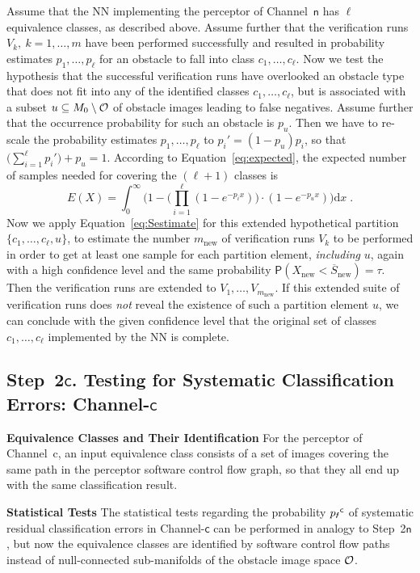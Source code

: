 \documentclass[runningheads,a4paper]{llncs}
\begin{document}
Assume that the NN implementing the perceptor of Channel~$\mathsf{n}$ has $\ell$ equivalence classes, as described  above. Assume further that the verification runs $V_k,\ k=1,\dots,m$ have been performed successfully and resulted in probability estimates $p_1,\dots,p_\ell$ for an obstacle to fall into class $c_1,\dots,c_\ell$.
Now we test the hypothesis that the successful verification runs have overlooked an obstacle type that does not fit into any of the identified classes $c_1,\dots,c_\ell$, but is associated with a subset $u\subseteq M_0\setminus {\cal O}$ of obstacle images leading to false negatives.  Assume further that the occurrence probability 
for such an obstacle is $p_u$. Then we have to re-scale the probability estimates $p_1,\dots,p_\ell$   
to $p_i' = (1-p_u)p_i$, so that
$
\big(\sum_{i=1}^\ell p_i'\big) + p_u = 1.
$
According to Equation~\eqref{eq:expected},
the expected number of   samples needed for covering the $(\ell+1)$ classes is
$$
E(X) = \int_0^\infty \Big( 1 - \big(\prod_{i=1}^\ell (1 - e^{-p_i x})\big)\cdot (1 - e^{-p_u x})  \Big)\mathrm{d}x\;.
$$
Now we apply Equation~\eqref{eq:Sestimate} for this extended hypothetical     partition
$\{c_1,\dots,c_\ell, u\}$,   to estimate the number $m_\text{new}$ of verification runs $V_k$ to be performed in order to get at least one sample for each partition element, {\it including} $u$, again with a high confidence level and the same probability $\mathsf{P}(X_\text{new} < \overline S_\text{new}) = \tau$. Then the verification runs are extended to 
$V_1,\dots,V_{m_\text{new}}$. If this extended suite of verification runs does {\it not} reveal the existence of 
such a partition element $u$,   we can conclude with the given confidence level that the original set of classes $c_1,\dots,c_\ell$ implemented by the NN is complete.

\subsection{Step~2$\mathsf{c}$.  Testing  for Systematic   Classification Errors:   Channel-$\mathsf{c}$}\label{sec:classerrorc}

\medskip
\noindent
{\bf Equivalence Classes and Their Identification}
For the perceptor of Channel~c, an input equivalence class consists of a set of images covering   the same path in the perceptor software control flow graph, so that 
they all end up with the same classification result. 

\medskip
\noindent
{\bf Statistical Tests}
The statistical tests regarding the probability ${p_\text{\Lightning}}^\mathsf{c}$ of systematic residual classification errors in Channel-$\mathsf{c}$ can be
performed in analogy to Step~2$\mathsf{n}$, but now the equivalence classes are identified by software control flow paths instead of null-connected sub-manifolds of the obstacle image space ${\cal O}$. 
\end{document}
